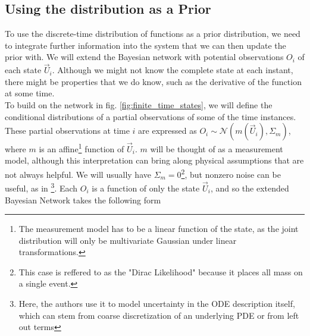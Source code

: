\subsection*{Using the distribution as a Prior}
To use the discrete-time distribution of functions as a prior distribution, we need to integrate further information into the system that we can then update the prior with. We will extend the Bayesian network with potential observations $O_i$ of each state $\vec{U}_i$. Although we might not know the complete state at each instant, there might be properties that we do know, such as the derivative of the function at some time. 
\\ To build on the network in fig. \ref{fig:finite_time_states}, we will define the conditional distributions of a partial observations of some of the time instances. These partial observations at time $i$ are expressed as $O_i \sim \mathcal{N}(m(\vec{U}_i), \Sigma_m)$, where $m$ is an affine\footnote{The measurement model has to be a linear function of the state, as the joint distribution will only be multivariate Gaussian under linear transformations.} function of $\vec{U}_i$. $m$ will be thought of as a measurement model, although this interpretation can bring along physical assumptions that are not always helpful. We will usually have $\Sigma_m = \mathcal{0}$\footnote{This case is reffered to as the "Dirac Likelihood" \cite{exponential_probabilistic} because it places all mass on a single event.}, but nonzero noise can be useful, as in \cite{pnmol}\footnote{Here, the authors use it to model uncertainty in the ODE description itself, which can stem from coarse discretization of an underlying PDE or from left out terms}.
Each $O_i$ is a function of only the state $\vec{U}_i$, and so the extended Bayesian Network takes the following form

